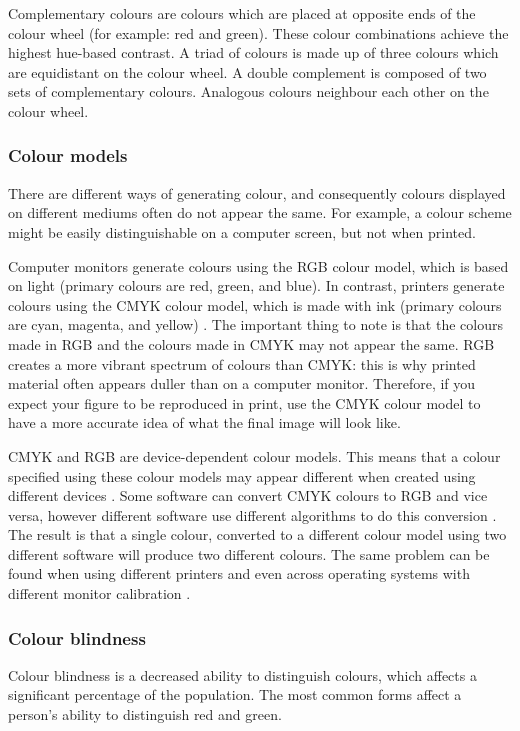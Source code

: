 \documentclass[letterpaper]{article}
\begin{document}
Complementary colours are colours which are placed at opposite ends of the colour wheel (for example: red and green). These colour combinations achieve the highest hue-based contrast. A triad of colours is made up of three colours which are equidistant on the colour wheel. A double complement is composed of two sets of complementary colours. Analogous colours neighbour each other on the colour wheel. 

\subsubsection{Colour models}
There are different ways of generating colour, and consequently colours displayed on different mediums often do not appear the same. For example, a colour scheme might be easily distinguishable on a computer screen, but not when printed. 

Computer monitors generate colours using the RGB colour model, which is based on light (primary colours are red, green, and blue). In contrast, printers generate colours using the CMYK colour model, which is made with ink (primary colours are cyan, magenta, and yellow) \cite{silva}. The important thing to note is that the colours made in RGB and the colours made in CMYK may not appear the same. RGB creates a more vibrant spectrum of colours than CMYK: this is why printed material often appears duller than on a computer monitor. Therefore, if you expect your figure to be reproduced in print, use the CMYK colour model to have a more accurate idea of what the final image will look like.

CMYK and RGB are device-dependent colour models. This means that a colour specified using these colour models may appear different when created using different devices \cite{silva}. Some software can convert CMYK colours to RGB and vice versa, however different software use different algorithms to do this conversion \cite{brewer-colour}. The result is that a single colour, converted to a different colour model using two different software will produce two different colours. The same problem can be found when using different printers and even across operating systems with different monitor calibration \cite{brewer-colour}. 

\subsubsection{Colour blindness}
Colour blindness is a decreased ability to distinguish colours, which affects a significant percentage of the population. The most common forms affect a person's ability to distinguish red and green.
\end{document}

